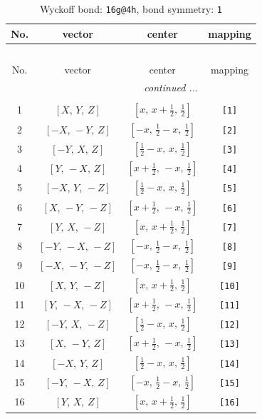 \documentclass[fleqn,8pt]{jsarticle}
\begin{document}
\begin{longtable}{cccc}
\caption{Wyckoff bond: {\tt 16g@4h}, bond symmetry: {\tt 1}}
 \\
 \hline \hline
No. & vector & center & mapping \\ \hline \endfirsthead

\multicolumn{3}{l}{\tablename\ \thetable{}} \\
 \hline \hline
No. & vector & center & mapping \\ \hline \endhead

 \hline \hline
\multicolumn{3}{r}{\footnotesize\it continued ...} \\ \endfoot

 \hline \hline
\multicolumn{3}{r}{} \\ \endlastfoot

1 & $\left[ X,\, Y,\, Z \right]$ & $\left[ x,\, x + \frac{1}{2},\, \frac{1}{2} \right]$ & {\tt [1]} \\ \hline
2 & $\left[ - X,\, - Y,\, Z \right]$ & $\left[ - x,\, \frac{1}{2} - x,\, \frac{1}{2} \right]$ & {\tt [2]} \\ \hline
3 & $\left[ - Y,\, X,\, Z \right]$ & $\left[ \frac{1}{2} - x,\, x,\, \frac{1}{2} \right]$ & {\tt [3]} \\ \hline
4 & $\left[ Y,\, - X,\, Z \right]$ & $\left[ x + \frac{1}{2},\, - x,\, \frac{1}{2} \right]$ & {\tt [4]} \\ \hline
5 & $\left[ - X,\, Y,\, - Z \right]$ & $\left[ \frac{1}{2} - x,\, x,\, \frac{1}{2} \right]$ & {\tt [5]} \\ \hline
6 & $\left[ X,\, - Y,\, - Z \right]$ & $\left[ x + \frac{1}{2},\, - x,\, \frac{1}{2} \right]$ & {\tt [6]} \\ \hline
7 & $\left[ Y,\, X,\, - Z \right]$ & $\left[ x,\, x + \frac{1}{2},\, \frac{1}{2} \right]$ & {\tt [7]} \\ \hline
8 & $\left[ - Y,\, - X,\, - Z \right]$ & $\left[ - x,\, \frac{1}{2} - x,\, \frac{1}{2} \right]$ & {\tt [8]} \\ \hline
9 & $\left[ - X,\, - Y,\, - Z \right]$ & $\left[ - x,\, \frac{1}{2} - x,\, \frac{1}{2} \right]$ & {\tt [9]} \\ \hline
10 & $\left[ X,\, Y,\, - Z \right]$ & $\left[ x,\, x + \frac{1}{2},\, \frac{1}{2} \right]$ & {\tt [10]} \\ \hline
11 & $\left[ Y,\, - X,\, - Z \right]$ & $\left[ x + \frac{1}{2},\, - x,\, \frac{1}{2} \right]$ & {\tt [11]} \\ \hline
12 & $\left[ - Y,\, X,\, - Z \right]$ & $\left[ \frac{1}{2} - x,\, x,\, \frac{1}{2} \right]$ & {\tt [12]} \\ \hline
13 & $\left[ X,\, - Y,\, Z \right]$ & $\left[ x + \frac{1}{2},\, - x,\, \frac{1}{2} \right]$ & {\tt [13]} \\ \hline
14 & $\left[ - X,\, Y,\, Z \right]$ & $\left[ \frac{1}{2} - x,\, x,\, \frac{1}{2} \right]$ & {\tt [14]} \\ \hline
15 & $\left[ - Y,\, - X,\, Z \right]$ & $\left[ - x,\, \frac{1}{2} - x,\, \frac{1}{2} \right]$ & {\tt [15]} \\ \hline
16 & $\left[ Y,\, X,\, Z \right]$ & $\left[ x,\, x + \frac{1}{2},\, \frac{1}{2} \right]$ & {\tt [16]} \\
\end{longtable}
\end{document}
